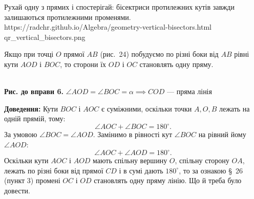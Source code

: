 %
{Рухай одну з прямих і спостерігай: бісектриси протилежних кутів завжди залишаються протилежними променями.}%
{https://radchr.github.io/Algebra/geometry-vertical-bisectors.html}%
{qr_vertical_bisectors.png}

\vspace{0.4cm}

\begin{problem}
Якщо при точці $O$ прямої $AB$ (рис.~24) побудуємо по різні боки від $AB$ рівні кути $AOD$ і $BOC$, то сторони їх $OD$ і $OC$ становлять одну пряму.
\end{problem}

\begin{center}
\\[4pt]
{\small\textbf{Рис. до вправи 6.} $\angle AOD = \angle BOC = \alpha \implies COD$ — пряма лінія}
\end{center}

\textbf{Доведення:}
Кути $BOC$ і $AOC$ є суміжними, оскільки точки $A, O, B$ лежать на одній прямій, тому:
\[
\angle AOC + \angle BOC = 180^\circ.
\]
За умовою $\angle BOC = \angle AOD$. Замінимо в рівності кут $\angle BOC$ на рівний йому $\angle AOD$:
\[
\angle AOC + \angle AOD = 180^\circ.
\]
Оскільки кути $AOC$ і $AOD$ мають спільну вершину $O$, спільну сторону $OA$, лежать по різні боки від прямої $CD$ і в сумі дають $180^\circ$, то за ознакою §~26 (пункт 3) промені $OC$ і $OD$ становлять одну пряму лінію. Що й треба було довести.

\vspace{0.4cm}

